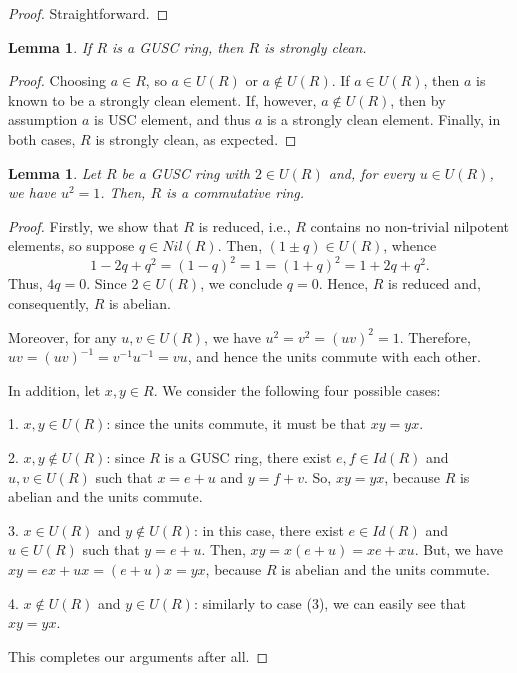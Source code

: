 \documentclass[12pt]{amsart}
\newtheorem{lemma}[theorem]{Lemma}
\theoremstyle{definition}
\begin{document}
\begin{proof} Straightforward.
\end{proof}

\begin{lemma}\label{lem2.2}
If $R$ is a GUSC ring, then $R$ is strongly clean.
\end{lemma}

\begin{proof}
Choosing $a \in R$, so $a \in U(R)$ or $a \not\in U(R)$. If $a \in U(R)$, then $a$ is known to be a strongly clean element. If, however, $a\not\in U(R)$, then by assumption $a$ is USC element, and thus $a$ is a strongly clean element. Finally, in both cases, $R$ is strongly clean, as expected.
\end{proof}

\begin{lemma}\label{lemma 2.6}
Let $R$ be a GUSC ring with $2 \in U(R)$ and, for every $u \in U(R)$, we have $u^2 = 1$. Then, $R$ is a commutative ring.
\end{lemma}

\begin{proof}
Firstly, we show that \( R \) is reduced, i.e., \( R \) contains no non-trivial nilpotent elements, so suppose \( q \in Nil(R) \). Then, \( (1 \pm q) \in U(R) \), whence
\[ 1 - 2q + q^2 = (1-q)^2 = 1 = (1+q)^2 = 1 + 2q + q^2. \]
Thus, \( 4q = 0 \). Since \( 2 \in U(R) \), we conclude \( q = 0 \). Hence, \( R \) is reduced and, consequently, \( R \) is abelian.
	
Moreover, for any \( u, v \in U(R) \), we have \( u^2 = v^2 = (uv)^2 = 1 \). Therefore, \( uv = (uv)^{-1} = v^{-1} u^{-1} = vu \), and hence the units commute with each other.
	
In addition, let \( x, y \in R \). We consider the following four possible cases:
	
1. \( x, y \in U(R) \): since the units commute, it must be that \( xy = yx \).
	
2. \( x, y \notin U(R) \): since \( R \) is a GUSC ring, there exist \( e, f \in Id(R) \) and $u, v\in U(R)$ such that \( x = e+u \) and \( y = f+v \). So, \( xy = yx \), because \( R \) is abelian and the units commute.
	
3. \( x \in U(R) \) and \( y \notin U(R) \): in this case, there exist \( e \in Id(R) \) and $u\in U(R)$ such that \( y = e+u \). Then, $xy=x(e+u)=xe+xu$. But, we have $xy=ex+ux=(e+u)x=yx$, because $R$ is abelian and the units commute.
	
4. \( x \notin U(R) \) and \( y \in U(R) \): similarly to case (3), we can easily see that \( xy = yx \).	

This completes our arguments after all.
\end{proof}
\end{document}
